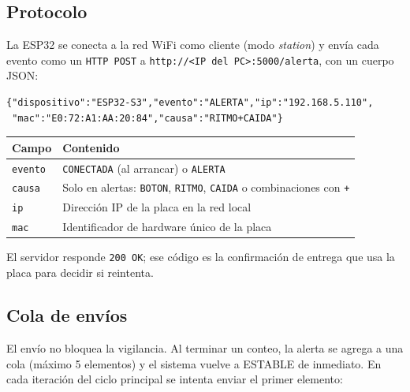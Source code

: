 \documentclass[11pt,a4paper]{article}
\begin{document}
\subsection{Protocolo}

La ESP32 se conecta a la red WiFi como cliente (modo \emph{station}) y envía cada
evento como un \texttt{HTTP POST} a \texttt{http://<IP del PC>:5000/alerta}, con un cuerpo JSON:

\begin{lstlisting}[numbers=none,language={}]
{"dispositivo":"ESP32-S3","evento":"ALERTA","ip":"192.168.5.110",
 "mac":"E0:72:A1:AA:20:84","causa":"RITMO+CAIDA"}
\end{lstlisting}

\begin{center}
\begin{tabular}{@{}ll@{}}
\toprule
\textbf{Campo} & \textbf{Contenido}\\
\midrule
\texttt{evento} & \texttt{CONECTADA} (al arrancar) o \texttt{ALERTA}\\
\texttt{causa} & Solo en alertas: \texttt{BOTON}, \texttt{RITMO}, \texttt{CAIDA} o combinaciones con \texttt{+}\\
\texttt{ip} & Dirección IP de la placa en la red local\\
\texttt{mac} & Identificador de hardware único de la placa\\
\bottomrule
\end{tabular}
\end{center}

El servidor responde \texttt{200 OK}; ese código es la confirmación de entrega que usa
la placa para decidir si reintenta.

\subsection{Cola de envíos}

El envío no bloquea la vigilancia. Al terminar un conteo, la alerta se agrega a una cola
(máximo 5 elementos) y el sistema vuelve a ESTABLE de inmediato. En cada iteración del
ciclo principal se intenta enviar el primer elemento:
\end{document}
